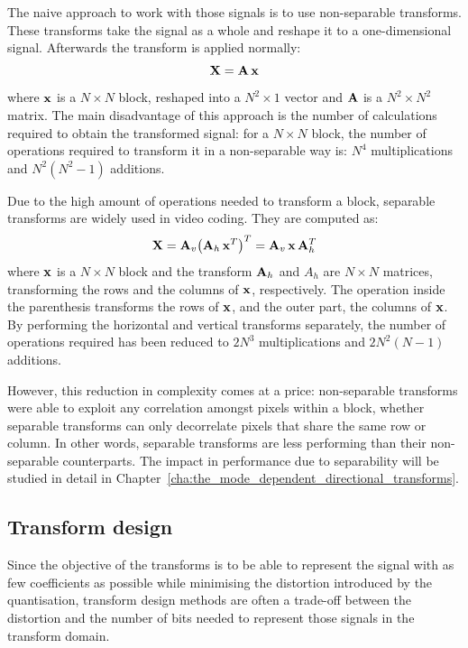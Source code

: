 \documentclass[11pt,a4paper,openright,twoside]{book}
\numberwithin{equation}{section} %
\numberwithin{figure}{section} %
\numberwithin{table}{section} %
\begin{document}
The naive approach to work with those signals is to use non-separable
transforms.
These transforms take the signal as a whole and reshape it to a
one-dimensional signal.
Afterwards the transform is applied normally:
\begin{equation}
	\mathbf{X} = \mathbf{A} \, \mathbf{x}
\end{equation}
where $\mathbf{x}$ is a $N \times N$ block, reshaped into a $N^2\times1$ vector
and $\mathbf{A}$ is a $N^2 \times N^2$ matrix.
The main disadvantage of this approach is the number of calculations
required to obtain the transformed signal: for a $N \times N$ block, the
number of operations required to transform it in a non-separable way is:
$N^4$ multiplications and $N^2(N^2-1)$ additions.

Due to the high amount of operations needed to transform a block,
separable transforms are widely used in video coding.
They are computed as:
\begin{equation}
	\mathbf{X} = \mathbf{A}_v {\left(\mathbf{A}_h \, \mathbf{x}^T\right)}^T = \mathbf{A}_v \, \mathbf{x} \, \mathbf{A}_h^T
	\label{eqn:sep_transform}
\end{equation}
where $\mathbf{x}$ is a $N \times N$ block and the transform $\mathbf{A}_h$ and $A_h$ are $N
\times N$ matrices, transforming the rows and the columns of $\mathbf{x}$,
respectively.
The operation inside the parenthesis transforms the rows of $\mathbf{x}$, and
the outer part, the columns of $\mathbf{x}$.
By performing the horizontal and vertical transforms separately, the
number of operations required has been reduced to $2N^3$ multiplications
and $2N^2(N-1)$ additions.

However, this reduction in complexity comes at a price: non-separable
transforms were able to exploit any correlation amongst pixels within a
block, whether separable transforms can only decorrelate pixels that
share the same row or column.
In other words, separable transforms are less performing than their
non-separable counterparts.
The impact in performance due to separability will be studied in detail
in Chapter~\ref{cha:the_mode_dependent_directional_transforms}.

\subsection{Transform design}
\label{sub:transform_design}

Since the objective of the transforms is to be able to represent the
signal with as few coefficients as possible while minimising the
distortion introduced by the quantisation, transform design methods are
often a trade-off between the distortion and the number of bits needed
to represent those signals in the transform domain.
\end{document}
